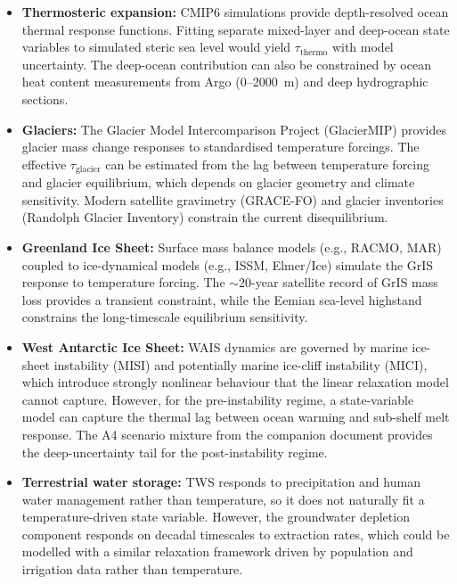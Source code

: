 \documentclass[11pt]{article}
\begin{document}
\begin{itemize}
  \item \textbf{Thermosteric expansion:} CMIP6 simulations provide depth-resolved ocean thermal response functions.  Fitting separate mixed-layer and deep-ocean state variables to simulated steric sea level would yield $\tau_{\text{thermo}}$ with model uncertainty.  The deep-ocean contribution can also be constrained by ocean heat content measurements from Argo (0--2000~m) and deep hydrographic sections.

  \item \textbf{Glaciers:} The Glacier Model Intercomparison Project (GlacierMIP) provides glacier mass change responses to standardised temperature forcings.  The effective $\tau_{\text{glacier}}$ can be estimated from the lag between temperature forcing and glacier equilibrium, which depends on glacier geometry and climate sensitivity.  Modern satellite gravimetry (GRACE-FO) and glacier inventories (Randolph Glacier Inventory) constrain the current disequilibrium.

  \item \textbf{Greenland Ice Sheet:} Surface mass balance models (e.g., RACMO, MAR) coupled to ice-dynamical models (e.g., ISSM, Elmer/Ice) simulate the GrIS response to temperature forcing.  The $\sim$20-year satellite record of GrIS mass loss provides a transient constraint, while the Eemian sea-level highstand constrains the long-timescale equilibrium sensitivity.

  \item \textbf{West Antarctic Ice Sheet:} WAIS dynamics are governed by marine ice-sheet instability (MISI) and potentially marine ice-cliff instability (MICI), which introduce strongly nonlinear behaviour that the linear relaxation model cannot capture.  However, for the pre-instability regime, a state-variable model can capture the thermal lag between ocean warming and sub-shelf melt response.  The A4 scenario mixture from the companion document provides the deep-uncertainty tail for the post-instability regime.

  \item \textbf{Terrestrial water storage:} TWS responds to precipitation and human water management rather than temperature, so it does not naturally fit a temperature-driven state variable.  However, the groundwater depletion component responds on decadal timescales to extraction rates, which could be modelled with a similar relaxation framework driven by population and irrigation data rather than temperature.
\end{itemize}
\end{document}
